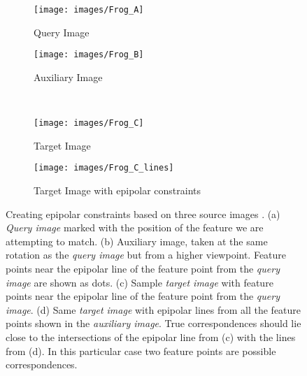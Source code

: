 \documentclass[10pt,journal,cspaper,compsoc]{IEEEtran}
\begin{document}
\begin{figure}[htb]
    \begin{subfigure}[t]{0.48\columnwidth}
        \centering
        \texttt{[image: images/Frog\_A]}
        \caption{Query Image}
        \label{fig:frog_a}
    \end{subfigure}%
    \quad %
    \begin{subfigure}[t]{0.48\columnwidth}
        \centering
        \texttt{[image: images/Frog\_B]}
        \caption{Auxiliary Image}
        \label{fig:frog_b}
    \end{subfigure}%
    \\ %
    \begin{subfigure}[t]{0.48\columnwidth}
        \centering
        \texttt{[image: images/Frog\_C]}
        \caption{Target Image}
        \label{fig:frog_c}
    \end{subfigure}%
    \quad %
    \begin{subfigure}[t]{0.48\columnwidth}
        \centering
        \texttt{[image: images/Frog\_C\_lines]}
        \caption{Target Image with epipolar constraints}
        \label{fig:frog_c_lines}
    \end{subfigure}%
    \caption{Creating epipolar constraints based on three source images \cite{moreels2007evaluation}.  
        (a) \emph{Query image} marked with the position 
        of the feature we are attempting to match. (b) 
        Auxiliary image, taken at the 
        same rotation as the \emph{query image} but from a higher 
        viewpoint. Feature points near the epipolar line 
        of the feature point from the \emph{query image} are shown as dots.
				(c) Sample \emph{target image} with feature points near the epipolar line of the feature point from the \emph{query image}.
				(d) Same \emph{target image} with epipolar lines from all the 
    feature points shown in the \emph{auxiliary image}. 
		True correspondences should lie close to the intersections 
    of the epipolar line from (c) with the lines from (d). In this particular case two 
    feature points are possible correspondences.
}%
    \label{fig:frog}%
\end{figure}%
\end{document}
